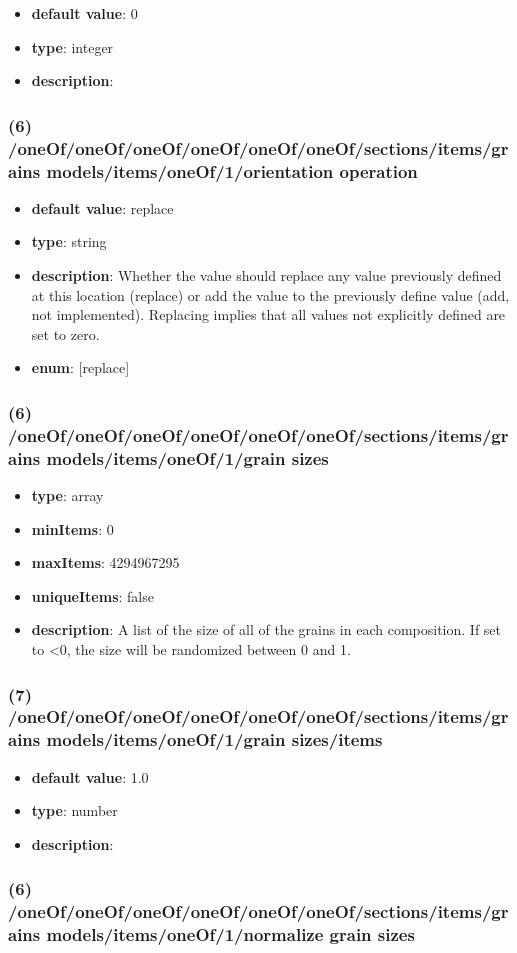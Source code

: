 \begin{itemize}[leftmargin=7em]\item {\bf default value}: 0
\item {\bf type}: integer
\item {\bf description}: 
\end{itemize}\subsubsection{(6) /oneOf/oneOf/oneOf/oneOf/oneOf/oneOf/sections/items/grains models/items/oneOf/1/orientation operation}
\begin{itemize}[leftmargin=6em]\item {\bf default value}: replace
\item {\bf type}: string
\item {\bf description}: Whether the value should replace any value previously defined at this location (replace) or add the value to the previously define value (add, not implemented). Replacing implies that all values not explicitly defined are set to zero.
\item {\bf enum}: [replace]\end{itemize}\subsubsection{(6) /oneOf/oneOf/oneOf/oneOf/oneOf/oneOf/sections/items/grains models/items/oneOf/1/grain sizes}
\begin{itemize}[leftmargin=6em]\item {\bf type}: array
\item {\bf minItems}: 0
\item {\bf maxItems}: 4294967295
\item {\bf uniqueItems}: false
\item {\bf description}: A list of the size of all of the grains in each composition. If set to <0, the size will be randomized between 0 and 1.
\end{itemize}\subsubsection{(7) /oneOf/oneOf/oneOf/oneOf/oneOf/oneOf/sections/items/grains models/items/oneOf/1/grain sizes/items}
\begin{itemize}[leftmargin=7em]\item {\bf default value}: 1.0
\item {\bf type}: number
\item {\bf description}: 
\end{itemize}\subsubsection{(6) /oneOf/oneOf/oneOf/oneOf/oneOf/oneOf/sections/items/grains models/items/oneOf/1/normalize grain sizes}
